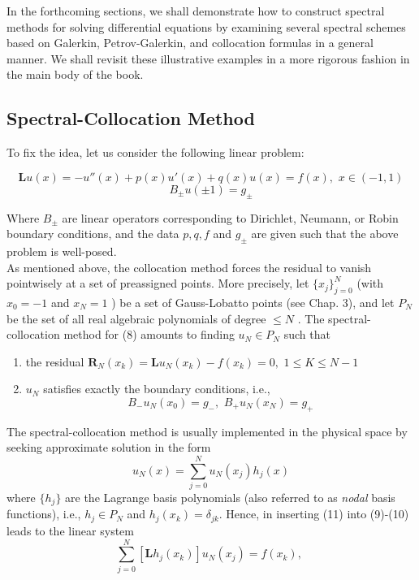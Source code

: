 In the forthcoming sections, we shall demonstrate how to construct spectral methods for solving differential equations by examining several spectral schemes based on Galerkin, Petrov-Galerkin, and collocation formulas in a general manner. We shall revisit these illustrative examples in a more rigorous fashion in the main body of the book.

\subsection{Spectral-Collocation Method}

To fix the idea, let us consider the following linear problem:

\[
	\mathbf{ L }u(x) = -u''(x) + p(x) u'(x) + q(x) u(x) = f(x), \hspace{4pt} x \in (-1,1)
\]
\begin{equation}
	B_{ \pm }u(\pm 1) = g_{ \pm }
\end{equation}

Where $ B_{ \pm } $ are linear operators corresponding to Dirichlet, Neumann, or Robin boundary conditions, and the data $ p,q,f $ and $ g_{ \pm } $ are given such that the above problem is well-posed. \\
\indent As mentioned above, the collocation method forces the residual to vanish pointwisely at a set of preassigned points. More precisely, let $ \{ x_{ j } \}_{ j=0 }^{ N } $ (with $ x_{ 0 }= -1 $ and $ x_{ N } = 1 $ ) be a set of Gauss-Lobatto points (see Chap. 3), and let $ P_{ N } $ be the set of all real algebraic polynomials of degree $ \leq N $ . The spectral-collocation method for (8) amounts to finding $ u_{ N } \in P_{ N } $ such that

\begin{enumerate}
	\item the residual $ \mathbf{ R }_{ N }(x_{ k }) = \mathbf{ L }u_{ N }(x_{ k }) - f(x_{ k }) = 0, \hspace{4pt} 1 \leq K \leq N-1 $ 
	\item $ u_{ N } $ satisfies exactly the boundary conditions, i.e.,
		\begin{equation}
			B_{ - }u_{ N }(x_{ 0 }) = g_{ - }, \hspace{4pt} B_{ + }u_{ N }\left( x_{ N } \right) = g_{ + }
		\end{equation}
\end{enumerate}

The spectral-collocation method is usually implemented in the physical space by seeking approximate solution in the form
\begin{equation}
	u_{ N }(x) = \sum_{ j=0 }^{ N } u_{ N }(x_{ j }) h_{ j }(x)	
\end{equation}
where $ \{ h_{ j } \} $ are the Lagrange basis polynomials (also referred to as \textit{nodal} basis functions), i.e., $ h_{ j } \in P_{ N } $ and $ h_{ j } (x_{ k }) = \delta_{ jk } $. Hence, in inserting (11) into (9)-(10) leads to the linear system
\[
	\sum_{ j=0 }^{ N } \left[ \mathbf{ L }h_{ j }(x_{ k }) \right] u_{ N }(x_{ j }) = f(x_{ k }), \hspace{4pt}
\]

